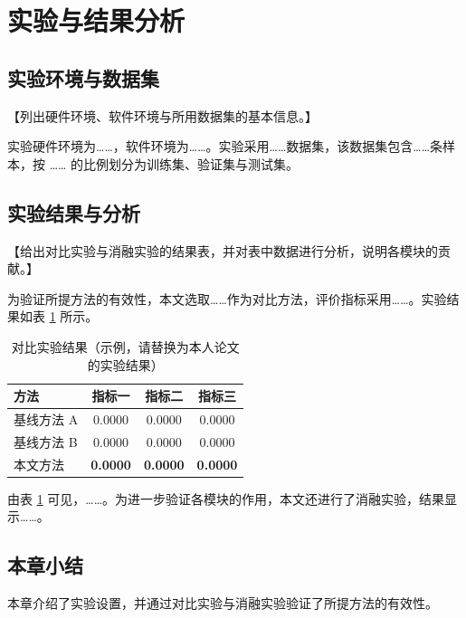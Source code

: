 \section{实验与结果分析}

\subsection{实验环境与数据集}

【列出硬件环境、软件环境与所用数据集的基本信息。】

实验硬件环境为……，软件环境为……。实验采用……数据集，该数据集包含……条样本，按 …… 的比例划分为训练集、验证集与测试集。

\subsection{实验结果与分析}

【给出对比实验与消融实验的结果表，并对表中数据进行分析，说明各模块的贡献。】

为验证所提方法的有效性，本文选取……作为对比方法，评价指标采用……。实验结果如表 \ref{tab:result} 所示。

\begin{table}[htbp]
  \centering
  \caption{对比实验结果（示例，请替换为本人论文的实验结果）}
  \label{tab:result}
  \vspace{0.8em}
  \renewcommand{\arraystretch}{1.3}
  \begin{tabular}{lccc}
    \toprule
    \textbf{方法} & \textbf{指标一} & \textbf{指标二} & \textbf{指标三} \\
    \midrule
    基线方法 A & 0.0000 & 0.0000 & 0.0000 \\
    基线方法 B & 0.0000 & 0.0000 & 0.0000 \\
    本文方法   & \textbf{0.0000} & \textbf{0.0000} & \textbf{0.0000} \\
    \bottomrule
  \end{tabular}
\end{table}

由表 \ref{tab:result} 可见，……。为进一步验证各模块的作用，本文还进行了消融实验，结果显示……。

\subsection{本章小结}

本章介绍了实验设置，并通过对比实验与消融实验验证了所提方法的有效性。
